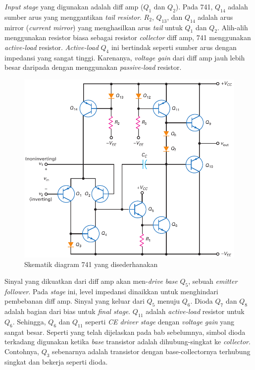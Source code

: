 \textit{Input stage} yang digunakan adalah diff amp ($ Q_1 $ dan $ Q_2 $). Pada 741, $ Q_{14} $ adalah sumber arus yang menggantikan \textit{tail resistor}. $ R_2 $, $ Q_{13} $, dan $ Q_{14} $ adalah arus mirror (\textit{current mirror}) yang menghasilkan arus \textit{tail} untuk $ Q_1 $ dan $ Q_2 $. Alih-alih menggunakan resistor biasa sebagai resistor \textit{collector} diff amp, 741 menggunakan \textit{active-load} resistor. \textit{Active-load} $ Q_4 $ ini bertindak seperti sumber arus dengan impedansi yang sangat tinggi. Karenanya, \textit{voltage gain} dari diff amp jauh lebih besar daripada dengan menggunakan \textit{passive-load} resistor.

\begin{figure}
	\centering
	\includegraphics[width=\linewidth]{pic/fig:16.04}
	\caption{Skematik diagram 741 yang disederhanakan}
	\label{fig:16.04}
\end{figure}

Sinyal yang dikuatkan dari diff amp akan men-\textit{drive} \textit{base} $ Q_5 $, sebuah \textit{emitter follower}. Pada \textit{stage} ini, level impedansi dinaikkan untuk menghindari pembebanan diff amp. Sinyal yang keluar dari $ Q_5 $ menuju $ Q_6 $. Dioda $ Q_7 $ dan $ Q_8 $ adalah bagian dari bias untuk \textit{final stage}. $ Q_{11} $ adalah \textit{active-load} resistor untuk $ Q_6 $. Sehingga, $ Q_6 $ dan $ Q_{11} $ seperti \textit{CE driver stage} dengan \textit{voltage gain} yang sangat besar. Seperti yang telah dijelaskan pada bab sebelumnya, simbol dioda terkadang digunakan ketika \textit{base} transistor adalah dihubung-singkat ke \textit{collector}. Contohnya, $ Q_3 $ sebenarnya adalah transistor dengan base-collectornya terhubung singkat dan bekerja seperti dioda.


